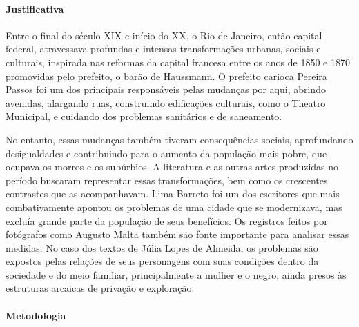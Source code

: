 \documentclass[12pt]{extarticle}
\begin{document}
\paragraph{Justificativa} Entre o final do século XIX e início do XX, o
Rio de Janeiro, então capital federal, atravessava profundas e intensas
transformações urbanas, sociais e culturais, inspirada nas reformas da
capital francesa entre os anos de 1850 e 1870 promovidas pelo prefeito,
o barão de Haussmann. O prefeito carioca Pereira Passos foi um dos
principais responsáveis pelas mudanças por aqui, abrindo avenidas,
alargando ruas, construindo edificações culturais, como o Theatro
Municipal, e cuidando dos problemas sanitários e de saneamento.








No entanto, essas mudanças também tiveram consequências sociais,
aprofundando desigualdades e contribuindo para o aumento da população
mais pobre, que ocupava os morros e os subúrbios. A literatura e as
outras artes produzidas no período buscaram representar essas
transformações, bem como os crescentes contrastes que as
acompanhavam. Lima Barreto foi um dos escritores que mais combativamente
apontou os problemas de uma cidade que se modernizava, mas excluía
grande parte da população de seus benefícios. Os registros feitos por
fotógrafos como Augusto Malta também são fonte importante para analisar
essas medidas. No caso dos textos de Júlia Lopes de Almeida, os
problemas são expostos pelas relações de seus personagens com suas
condições dentro da sociedade e do meio familiar, principalmente a
mulher e o negro, ainda presos às estruturas arcaicas de privação e
exploração.

\paragraph{Metodologia} 


\end{document}
